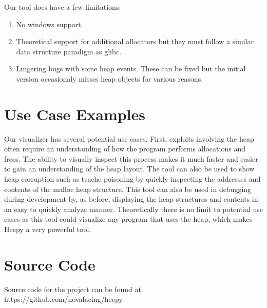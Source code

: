 \documentclass[12pt]{article}
\begin{document}
Our tool does have a few limitations: \\

\begin{enumerate}
    \item No windows support. \\
    \item Theoretical support for additional allocators but they must follow a similar data structure paradigm as glibc. \\
    \item Lingering bugs with some heap events. These can be fixed but the initial version occasionaly misses heap objects for various reasons. \\
\end{enumerate}

\section{Use Case Examples}

Our visualizer has several potential use cases. First, exploits involving the heap often require an understanding of how the program performs allocations and frees. The ability to visually inspect this process makes it much faster and easier to gain an understanding of the heap layout. The tool can also be used to show heap corruption such as tcache poisoning by quickly inspecting the addresses and contents of the malloc heap structure. This tool can also be used in debugging during development by, as before, displaying the heap structures and contents in an easy to quickly analyze manner. Theoretically there is no limit to potential use cases as this tool could visualize any program that uses the heap, which makes Heepy a very powerful tool. \\

\section{Source Code}

Source code for the project can be found at https://github.com/novafacing/heepy.
\end{document}
